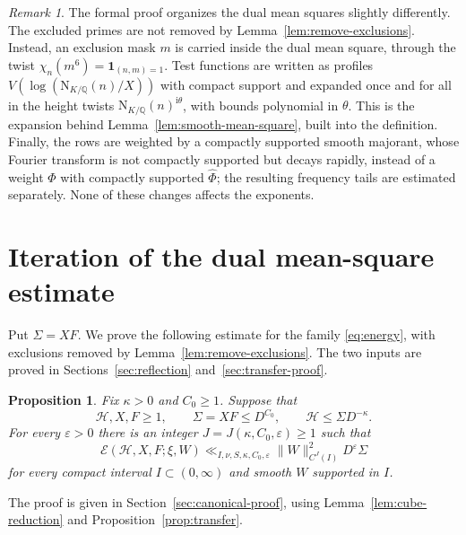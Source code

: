 \documentclass[11pt,a4paper]{article}
\numberwithin{equation}{section}
\numberwithin{figure}{section}
\newtheorem{proposition}[theorem]{Proposition}
\theoremstyle{definition}
\theoremstyle{remark}
\newtheorem{remark}[theorem]{Remark}
\newcommand{\Q}{\mathbb Q}
\newcommand{\NK}{\mathrm N_{K/\Q}}
\newcommand{\E}{\mathcal E}
\newcommand{\ind}{\mathbf1}
\begin{document}
\begin{remark}\label{rem:formal-dual}
The formal proof organizes the dual mean squares slightly differently. The excluded primes are
not removed by Lemma~\ref{lem:remove-exclusions}. Instead, an exclusion mask $m$ is carried
inside the dual mean square, through the twist $\chi_n(m^6)=\ind_{(n,m)=1}$. Test functions are
written as profiles $V(\log(\NK(n)/X))$ with compact support and expanded once and for all in
the height twists $\NK(n)^{\mathrm i\theta}$, with bounds polynomial in $\theta$. This is the
expansion behind Lemma~\ref{lem:smooth-mean-square}, built into the definition. Finally, the
rows are weighted by a compactly supported smooth majorant, whose Fourier transform is not
compactly supported but decays rapidly, instead of a weight $\Phi$ with compactly supported
$\widehat\Phi$; the resulting frequency tails are estimated separately. None of these changes
affects the exponents.
\end{remark}

\section[Iteration of the dual mean-square estimate]{\texorpdfstring{Iteration of the dual mean-square estimate}{Iteration of the dual mean-square estimate}}\label{sec:descent}

Put $\Sigma=XF$. We prove the following estimate for the family
\eqref{eq:energy}, with exclusions removed by
Lemma~\ref{lem:remove-exclusions}. The two inputs are proved in
Sections~\ref{sec:reflection} and~\ref{sec:transfer-proof}.

\begin{proposition}\label{prop:canonical}
Fix $\kappa>0$ and $C_0\ge1$. Suppose that
\begin{equation}\label{eq:positive-gap}
 \mathcal H,X,F\ge1,\qquad
 \Sigma=XF\le D^{C_0},\qquad
 \mathcal H\le\Sigma D^{-\kappa}.
\end{equation}
For every $\varepsilon>0$ there is an integer
$J=J(\kappa,C_0,\varepsilon)\ge1$ such that
\begin{equation}\label{eq:canonical-bound}
 \E(\mathcal H,X,F;\xi,W)
 \ll_{I,\nu,S,\kappa,C_0,\varepsilon}
 \|W\|_{C^J(I)}^2D^\varepsilon\Sigma
\end{equation}
for every compact interval $I\subset(0,\infty)$ and smooth $W$ supported
in $I$.
\end{proposition}

The proof is given in Section~\ref{sec:canonical-proof}, using
Lemma~\ref{lem:cube-reduction} and Proposition~\ref{prop:transfer}.
\end{document}
